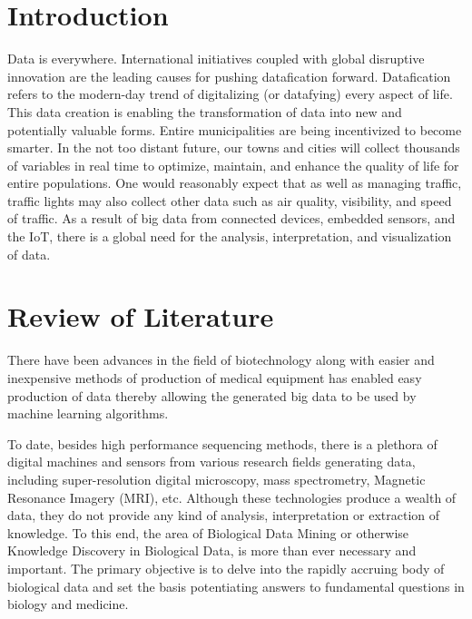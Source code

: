 \documentclass[12pt]{article}
\begin{document}
\newpage
\part{Introduction}
Data is everywhere. International initiatives coupled with global disruptive innovation are the leading causes for pushing datafication forward. Datafication refers to the modern-day trend of digitalizing (or datafying) every aspect of life. This data creation is enabling the transformation of data into new and potentially valuable forms. Entire municipalities are being incentivized to become smarter. In the not too distant future, our towns and cities will collect thousands of variables in real time to optimize, maintain, and enhance the quality of life for entire populations. One would reasonably expect that as well as managing traffic, traffic lights may also collect other data such as air quality, visibility, and speed of traffic. As a result of big data from connected devices, embedded sensors, and the IoT, there is a global need for the analysis, interpretation, and visualization of data.

\newpage
\part{Review of Literature}

There have been advances in the field of biotechnology along with easier and inexpensive methods of production of medical equipment has enabled easy production of data thereby allowing the generated big data to be used by machine learning algorithms.

To date, besides high performance sequencing methods, there is a plethora of digital machines and sensors from various research fields generating data, including super-resolution digital microscopy, mass spectrometry, Magnetic Resonance Imagery (MRI), etc. Although these technologies produce a wealth of data, they do not provide any kind of analysis, interpretation or extraction of knowledge. To this end, the area of Biological Data Mining or otherwise Knowledge Discovery in Biological Data, is more than ever necessary and important. The primary objective is to delve into the rapidly accruing body of biological data
and set the basis potentiating answers to fundamental questions in biology and medicine.
\end{document}
